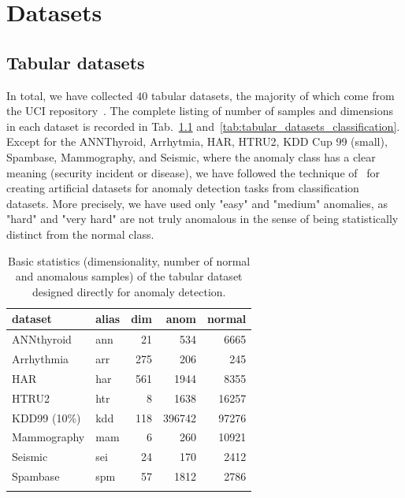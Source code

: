 \chapter{Datasets} \label{sec:appendix_datasets}

\section{Tabular datasets} \label{sec:tabular_datasets}
In total, we have collected $40$ tabular datasets, the majority of which come from the UCI repository~\cite{Dua:2019}. The complete listing of number of samples and dimensions in each dataset is recorded in Tab.~\ref{tab:tabular_datasets_anomaly} and~\ref{tab:tabular_datasets_classification}. Except for the ANNThyroid, Arrhytmia, HAR, HTRU2, KDD Cup 99 (small), Spambase, Mammography, and Seismic, where the anomaly class has a clear meaning (security incident or disease), we have followed the technique of~\cite{emmott2013systematic} for creating artificial datasets for anomaly detection tasks from classification datasets. More precisely, we have used only "easy" and "medium" anomalies, as "hard" and "very hard" are not truly anomalous in the sense of being statistically distinct from the normal class.

\begin{table}
    \centering
    \tabcolsep=0.1cm
    \begin{tabular}{llrrr}
    \toprule
    \textbf{dataset} & \textbf{alias} & \textbf{dim} & \textbf{anom} & \textbf{normal}   \\\midrule
    ANNthyroid & ann  & 21 & 534 & 6665 \\
    Arrhythmia & arr  & 275 & 206 & 245 \\
    HAR & har & 561 & 1944 & 8355  \\
    HTRU2 & htr & 8 & 1638 & 16257  \\
    KDD99 (10\%) & kdd & 118 & 396742 & 97276  \\
    Mammography & mam & 6 & 260 & 10921  \\
    Seismic & sei  & 24 & 170 & 2412  \\
    Spambase & spm & 57 & 1812 & 2786  \\
    \\\bottomrule
    \end{tabular}
    \vspace*{0.15cm}
    \caption{Basic statistics (dimensionality, number of normal and anomalous samples) of the tabular dataset designed directly for anomaly detection.}
    \label{tab:tabular_datasets_anomaly}
\end{table}

